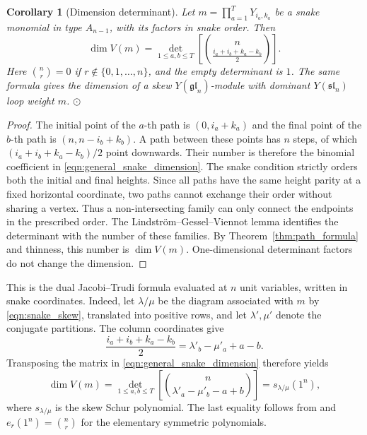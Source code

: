 \documentclass[12pt,reqno]{amsart}
\numberwithin{equation}{section}
\newtheorem{cor}[thm]{Corollary}
\begin{document}
\begin{cor}[Dimension determinant]\label{cor:LGV_Det_dim}
Let $m=\prod_{a=1}^{T}Y_{i_a,k_a}$ be a snake monomial in type
$A_{n-1}$, with its factors in snake order. Then
\begin{equation}
    \dim V(m)=
    \det_{1\leq a,b\leq T}
    \left[\binom{n}{\frac{i_a+i_b+k_a-k_b}{2}}\right].
    \label{eqn:general_snake_dimension}
\end{equation}
Here $\binom{n}{r}=0$ if $r\notin\{0,1,\ldots,n\}$, and the
empty determinant is $1$. The same formula gives the dimension
of a skew $Y(\mathfrak{gl}_n)$-module with dominant
$Y(\mathfrak{sl}_n)$ loop weight $m$. $\odot$
\end{cor}

\begin{proof}
The initial point of the $a$-th path is $(0,i_a+k_a)$ and the
final point of the $b$-th path is $(n,n-i_b+k_b)$. A path between
these points has $n$ steps, of which
$(i_a+i_b+k_a-k_b)/2$ point downwards. Their number is therefore
the binomial coefficient in \eqref{eqn:general_snake_dimension}.
The snake condition strictly orders both the initial and final
heights. Since all paths have the same height parity at a fixed
horizontal coordinate, two paths cannot exchange their order
without sharing a vertex. Thus a non-intersecting family can
only connect the endpoints in the prescribed order.
The Lindstr\"om--Gessel--Viennot lemma \cite{GesselViennot1985}
identifies the determinant with the number of these families.
By Theorem~\ref{thm:path_formula} and thinness, this number is
$\dim V(m)$. One-dimensional determinant factors do not change
the dimension.
\end{proof}

This is the dual Jacobi--Trudi formula evaluated at $n$ unit
variables, written in snake coordinates. Indeed, let $\lambda/\mu$
be the diagram associated with $m$ by \eqref{eqn:snake_skew},
translated into positive rows, and let $\lambda',\mu'$ denote
the conjugate partitions. The column coordinates give
\begin{equation*}
    \frac{i_a+i_b+k_a-k_b}{2}
    =\lambda'_b-\mu'_a+a-b.
\end{equation*}
Transposing the matrix in \eqref{eqn:general_snake_dimension}
therefore yields
\begin{equation*}
    \dim V(m)=
    \det_{1\leq a,b\leq T}
    \left[\binom{n}{\lambda'_a-\mu'_b-a+b}\right]
    =s_{\lambda/\mu}(1^n),
\end{equation*}
where $s_{\lambda/\mu}$ is the skew Schur polynomial. The last
equality follows from \cite[Eq.~(42)]{vanLeeuwen2006} and
$e_r(1^n)=\binom{n}{r}$ for the elementary symmetric polynomials.
\end{document}
